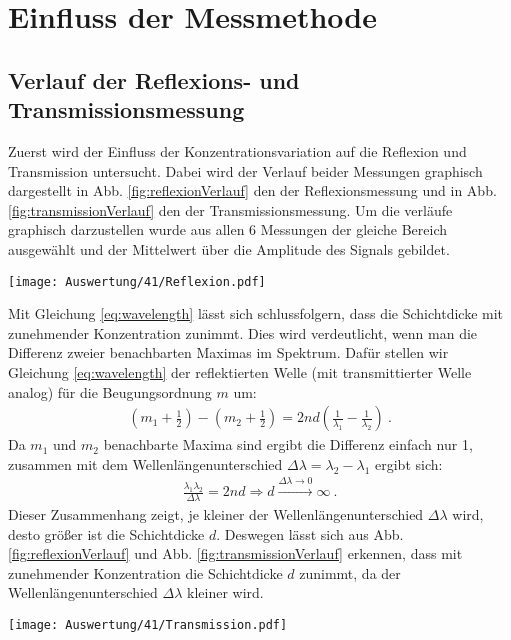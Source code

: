 
\section{Einfluss der Messmethode}
\label{sec:mess}

\subsection{Verlauf der Reflexions- und Transmissionsmessung}
\label{sub:verlauf}

Zuerst wird der Einfluss der Konzentrationsvariation auf die Reflexion und Transmission untersucht. 
Dabei wird der Verlauf beider Messungen graphisch dargestellt in Abb. \ref{fig:reflexionVerlauf} den der Reflexionsmessung und in Abb. \ref{fig:transmissionVerlauf} den der Transmissionsmessung. Um die verläufe graphisch darzustellen wurde aus allen 6 Messungen der gleiche Bereich ausgewählt und der Mittelwert über die Amplitude des Signals gebildet.
\begin{center}
	\captionsetup{type=figure}
	\texttt{[image: Auswertung/41/Reflexion.pdf]}
	\label{fig:reflexionVerlauf}
\end{center}
Mit Gleichung \ref{eq:wavelength} lässt sich schlussfolgern, dass die Schichtdicke mit zunehmender Konzentration zunimmt. Dies wird verdeutlicht, wenn man die Differenz zweier benachbarten Maximas im Spektrum. Dafür stellen wir Gleichung \ref{eq:wavelength} der reflektierten Welle (mit transmittierter Welle analog) für die Beugungsordnung $m$ um:
\begin{gather}
	\left(m_1 + \frac{1}{2}\right) - \left(m_2 + \frac{1}{2}\right) = 2nd \left(\frac{1}{\lambda_1} - \frac{1}{\lambda_2}\right)~.
\end{gather}
Da $m_1$ und $m_2$ benachbarte Maxima sind ergibt die Differenz einfach nur 1, zusammen mit dem Wellenlängenunterschied $\Delta \lambda = \lambda_2 - \lambda_1$ ergibt sich:
\begin{gather}
	\boxed{\frac{\lambda_1\lambda_2}{\Delta\lambda} = 2nd \Rightarrow d \xrightarrow{\Delta \lambda \rightarrow 0} \infty}~.
\end{gather} 
Dieser Zusammenhang zeigt, je kleiner der Wellenlängenunterschied $\Delta \lambda$ wird, desto größer ist die Schichtdicke $d$. Deswegen lässt sich aus Abb. \ref{fig:reflexionVerlauf} und Abb. \ref{fig:transmissionVerlauf} erkennen, dass mit zunehmender Konzentration die Schichtdicke $d$ zunimmt, da der Wellenlängenunterschied $\Delta \lambda$ kleiner wird.
\begin{center}
	\captionsetup{type=figure}
	\texttt{[image: Auswertung/41/Transmission.pdf]}
	\label{fig:transmissionVerlauf}
\end{center}

